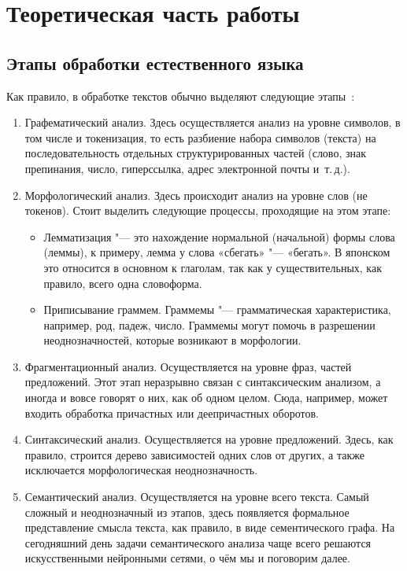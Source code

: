 

\chapter{Теоретическая часть работы}


\section{Этапы обработки естественного языка}


Как правило, в обработке текстов обычно выделяют следующие этапы~\cite[с.~9]{Batruha}:
\begin{enumerate}[1.]%
  \item Графематический анализ.
    Здесь осуществляется анализ на уровне символов, в том числе и токенизация, то есть разбиение набора символов (текста) на последовательность отдельных структурированных частей (слово, знак препинания, число, гиперссылка, адрес электронной почты и~т.\,д.).
  \item Морфологический анализ.
    Здесь происходит анализ на уровне слов (не токенов).
    Стоит выделить следующие процессы, проходящие на этом этапе:
    \begin{itemize}%
      \item Лемматизация
        "--- это нахождение нормальной (начальной) формы слова (леммы), к примеру, лемма у слова «сбегать» "--- «бегать».
        В японском это относится в основном к глаголам, так как у существительных, как правило, всего одна словоформа.
      \item Приписывание граммем.
        Граммемы "--- грамматическая характеристика, например, род, падеж, число.
        Граммемы могут помочь в разрешении неоднозначностей, которые возникают в морфологии.
    \end{itemize}
  \item Фрагментационный анализ.
    Осуществляется на уровне фраз, частей предложений. Этот этап неразрывно связан с синтаксическим анализом, а иногда и вовсе говорят о них, как об одном целом. Сюда, например, может входить обработка причастных или деепричастных оборотов.
  \item Синтаксический анализ.
    Осуществляется на уровне предложений.
    Здесь, как правило, строится дерево зависимостей одних слов от других, а также исключается морфологическая неоднозначность.
  \item Семантический анализ.
    Осуществляется на уровне всего текста.
    Самый сложный и неоднозначный из этапов, здесь появляется формальное представление смысла текста, как правило, в виде сементического графа.
    На сегодняшний день задачи семантического анализа чаще всего решаются искусственными нейронными сетями, о чём мы и поговорим далее.
\end{enumerate}


